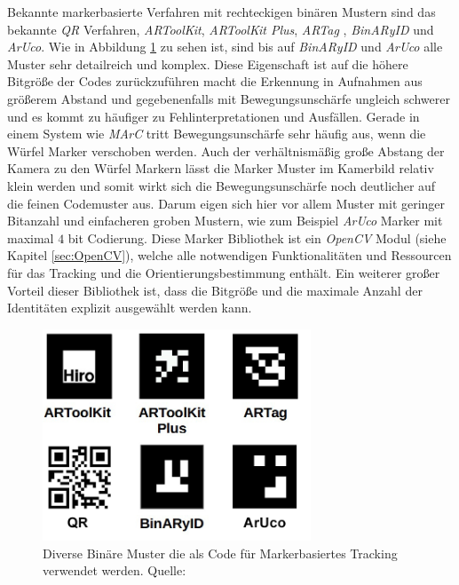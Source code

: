 Bekannte markerbasierte Verfahren mit rechteckigen binären Mustern sind das bekannte \textit{QR} Verfahren, \textit{ARToolKit}\cite{article:MarkerARTOOL}, \textit{ARToolKit Plus}\cite{article:MarkerARTOOL2}, \textit{ARTag} \cite{article:MarkerARTag}, \textit{BinARyID}\cite{article:MarkerBinAR} und \textit{ArUco}\cite{article:Aruco2014}. Wie in Abbildung \ref{fig:BinMarker} zu sehen ist, sind bis auf \textit{BinARyID} und \textit{ArUco} alle Muster sehr detailreich und komplex. Diese Eigenschaft ist auf die höhere Bitgröße der Codes zurückzuführen macht die Erkennung in Aufnahmen aus größerem Abstand und gegebenenfalls mit Bewegungsunschärfe ungleich schwerer und es kommt zu häufiger zu Fehlinterpretationen und Ausfällen. Gerade in einem System wie \textit{MArC} tritt Bewegungsunschärfe sehr häufig aus, wenn die Würfel Marker verschoben werden. Auch der verhältnismäßig große Abstang der Kamera zu den Würfel Markern lässt die Marker Muster im Kamerbild relativ klein werden und somit wirkt sich die Bewegungsunschärfe noch deutlicher auf die feinen Codemuster aus. Darum eigen sich hier vor allem Muster mit geringer Bitanzahl und einfacheren groben Mustern, wie zum Beispiel \textit{ArUco} Marker mit maximal $4$ bit Codierung. Diese Marker Bibliothek ist ein \textit{OpenCV} Modul (siehe Kapitel \ref{sec:OpenCV}), welche alle notwendigen Funktionalitäten und Ressourcen für das Tracking und die Orientierungsbestimmung enthält. Ein weiterer großer Vorteil dieser Bibliothek ist, dass die Bitgröße und die maximale Anzahl der Identitäten explizit ausgewählt werden kann.


\begin{figure}[H] 
	\center 
	\includegraphics[width=8cm]{Bilder/BinMuster.jpg}			
	\caption{Diverse Binäre Muster die als Code für Markerbasiertes Tracking verwendet werden. Quelle: \cite{article:Aruco2014}}
	\label{fig:BinMarker}
\end{figure}

\newpage